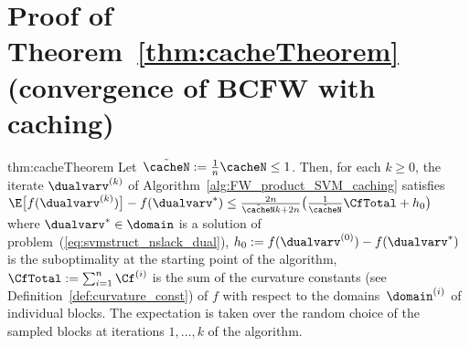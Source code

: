 \documentclass{article}
\begin{document}
\section{Proof of Theorem~\ref{thm:cacheTheorem} (convergence of BCFW with caching)\label{app:caching_theorem}}
\begin{reptheorem}{thm:cacheTheorem} \label{thm:convergence_cache_supp}
Let~$\tilde{\cacheN} := \frac1n\cacheN \leq 1$. 
Then, for each $k\ge 0$, the iterate $\dualvarv^{(k)}$ of %
Algorithm~\ref{alg:FW_product_SVM_caching} satisfies
$
\E\big[f(\dualvarv^{(k)})\big] - f(\dualvarv^*) \le \frac{2n}{\tilde{\cacheN}k+2n}\big(\frac{1}{\tilde{\cacheN}}\CfTotal+ h_0\big)
$
where $\dualvarv^*\in \domain$ is a solution of problem~(\ref{eq:svmstruct_nslack_dual}), $h_0 := f(\dualvarv^{(0)}) - f(\dualvarv^*)$ is the suboptimality at the starting point of the algorithm, $\CfTotal := \sum_{i=1}^n \Cf^{(i)}$ is the sum of the curvature constants (see Definition~\ref{def:curvature_const}) of $f$ with respect to the domains~$\domain^{(i)}$ of individual blocks.
The expectation is taken over the random choice of the sampled blocks at iterations $1,\dots,k$ of the algorithm.
\end{reptheorem}
\end{document}
